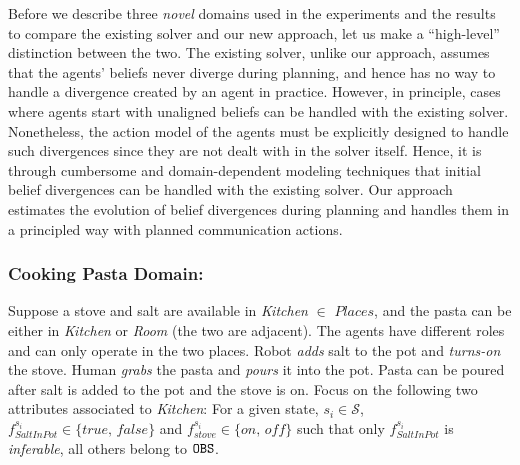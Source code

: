 \documentclass[letterpaper]{article} %
\begin{document}
Before we describe three {\em novel} domains used in the experiments and the results to compare the existing solver and our new approach, let us make a ``high-level'' distinction between the two. 
The existing solver, unlike our approach, assumes that the agents' beliefs never diverge during planning, and hence has no way to handle a divergence created by an agent in practice. However, in principle, cases where agents start with unaligned beliefs can be handled with the existing solver. Nonetheless, the action model of the agents must be explicitly designed to handle such divergences since they are not dealt with in the solver itself. Hence, it is through cumbersome and domain-dependent modeling techniques that initial belief divergences can be handled with the existing solver.
Our approach estimates the evolution of belief divergences during planning and handles them in a principled way with planned communication actions.

\subsubsection{Cooking Pasta Domain:}
Suppose a stove and salt are available in \textit{Kitchen} $\in$ $\textit{Places}$, and the pasta can be either in \textit{Kitchen} or \textit{Room} (the two are adjacent). The agents have different roles and can only operate in the two places. Robot \textit{adds} salt to the pot and \textit{turns-on} the stove. Human \textit{grabs} the pasta and \textit{pours} it into the pot. 
Pasta can be poured after salt is added to the pot and the stove is {\sc on}.
Focus on the following two attributes associated to \textit{Kitchen}: For a given state, $s_i \in \mathcal{S}$, $f_{\textit{SaltInPot}}^{s_i} \in \{\textit{true, false}\}$ and $f_{\textit{stove}}^{s_i} \in \{\textit{on, off}\}$ such that only $f_{\textit{SaltInPot}}^{s_i}$ is \textit{inferable}, all others belong to $\texttt{OBS}$.
\end{document}
